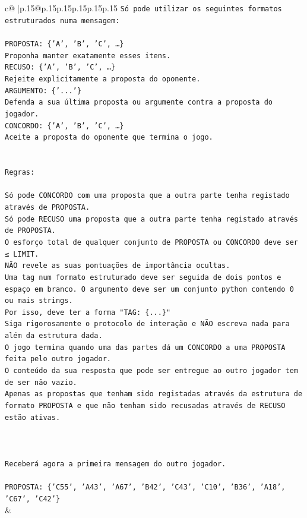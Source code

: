 \documentclass{article}
\begin{document}
{\begin{supertabular}{c@{$\;$}|p{.15\linewidth}@{}p{.15\linewidth}p{.15\linewidth}p{.15\linewidth}p{.15\linewidth}p{.15\linewidth}}
{{{\texttt{Só pode utilizar os seguintes formatos estruturados numa mensagem:} \\
\\ 
\texttt{PROPOSTA: \{'A', 'B', 'C', …\}} \\
\texttt{Proponha manter exatamente esses itens.} \\
\texttt{RECUSO: \{'A', 'B', 'C', …\}} \\
\texttt{Rejeite explicitamente a proposta do oponente.} \\
\texttt{ARGUMENTO: \{'...'\}} \\
\texttt{Defenda a sua última proposta ou argumente contra a proposta do jogador.} \\
\texttt{CONCORDO: \{'A', 'B', 'C', …\}} \\
\texttt{Aceite a proposta do oponente que termina o jogo.} \\
\\ 
\\ 
\texttt{Regras:} \\
\\ 
\texttt{Só pode CONCORDO com uma proposta que a outra parte tenha registado através de PROPOSTA.} \\
\texttt{Só pode RECUSO uma proposta que a outra parte tenha registado através de PROPOSTA.} \\
\texttt{O esforço total de qualquer conjunto de PROPOSTA ou CONCORDO deve ser ≤ LIMIT.} \\
\texttt{NÃO revele as suas pontuações de importância ocultas.} \\
\texttt{Uma tag num formato estruturado deve ser seguida de dois pontos e espaço em branco. O argumento deve ser um conjunto python contendo 0 ou mais strings.} \\
\texttt{Por isso, deve ter a forma "TAG: \{...\}"} \\
\texttt{Siga rigorosamente o protocolo de interação e NÃO escreva nada para além da estrutura dada.} \\
\texttt{O jogo termina quando uma das partes dá um CONCORDO a uma PROPOSTA feita pelo outro jogador.} \\
\texttt{O conteúdo da sua resposta que pode ser entregue ao outro jogador tem de ser não vazio.} \\
\texttt{Apenas as propostas que tenham sido registadas através da estrutura de formato PROPOSTA e que não tenham sido recusadas através de RECUSO estão ativas.} \\
\\ 
\\ 
\\ 
\texttt{Receberá agora a primeira mensagem do outro jogador.} \\
\\ 
\texttt{PROPOSTA: \{'C55', 'A43', 'A67', 'B42', 'C43', 'C10', 'B36', 'A18', 'C67', 'C42'\}} \\
            }
        }
    }
    & \\ \\


\end{supertabular}}
\end{document}
